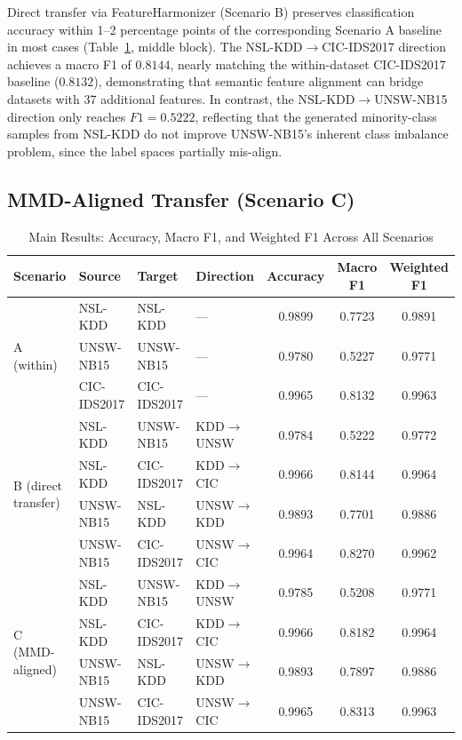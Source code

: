 \documentclass[conference]{IEEEtran}
\begin{document}
Direct transfer via FeatureHarmonizer (Scenario B) preserves classification
accuracy within 1--2 percentage points of the corresponding Scenario A
baseline in most cases (Table~\ref{tab:main_results}, middle block).
The NSL-KDD$\to$CIC-IDS2017 direction achieves a macro F1 of $0.8144$,
nearly matching the within-dataset CIC-IDS2017 baseline ($0.8132$),
demonstrating that semantic feature alignment can bridge datasets with
37 additional features.
In contrast, the NSL-KDD$\to$UNSW-NB15 direction only reaches
$F1 = 0.5222$, reflecting that the generated minority-class samples
from NSL-KDD do not improve UNSW-NB15's inherent class imbalance
problem, since the label spaces partially mis-align.

\subsection{MMD-Aligned Transfer (Scenario C)}

\begin{table}[htbp]
\caption{Main Results: Accuracy, Macro F1, and Weighted F1 Across All Scenarios}
\label{tab:main_results}
\centering
\renewcommand{\arraystretch}{1.15}
\begin{tabular}{llllccc}
\toprule
Scenario & Source & Target & Direction & Accuracy & Macro F1 & Weighted F1 \\
\midrule
\multirow{3}{*}{A (within)}
  & NSL-KDD     & NSL-KDD     & ---                         & 0.9899 & 0.7723 & 0.9891 \\
  & UNSW-NB15   & UNSW-NB15   & ---                         & 0.9780 & 0.5227 & 0.9771 \\
  & CIC-IDS2017 & CIC-IDS2017 & ---                         & 0.9965 & 0.8132 & 0.9963 \\
\midrule
\multirow{4}{*}{B (direct transfer)}
  & NSL-KDD   & UNSW-NB15   & KDD$\to$UNSW  & 0.9784 & 0.5222 & 0.9772 \\
  & NSL-KDD   & CIC-IDS2017 & KDD$\to$CIC   & 0.9966 & 0.8144 & 0.9964 \\
  & UNSW-NB15 & NSL-KDD     & UNSW$\to$KDD  & 0.9893 & 0.7701 & 0.9886 \\
  & UNSW-NB15 & CIC-IDS2017 & UNSW$\to$CIC  & 0.9964 & 0.8270 & 0.9962 \\
\midrule
\multirow{4}{*}{C (MMD-aligned)}
  & NSL-KDD   & UNSW-NB15   & KDD$\to$UNSW  & 0.9785 & 0.5208 & 0.9771 \\
  & NSL-KDD   & CIC-IDS2017 & KDD$\to$CIC   & 0.9966 & 0.8182 & 0.9964 \\
  & UNSW-NB15 & NSL-KDD     & UNSW$\to$KDD  & 0.9893 & 0.7897 & 0.9886 \\
  & UNSW-NB15 & CIC-IDS2017 & UNSW$\to$CIC  & 0.9965 & 0.8313 & 0.9963 \\
\bottomrule
\end{tabular}
\end{table}
\end{document}
